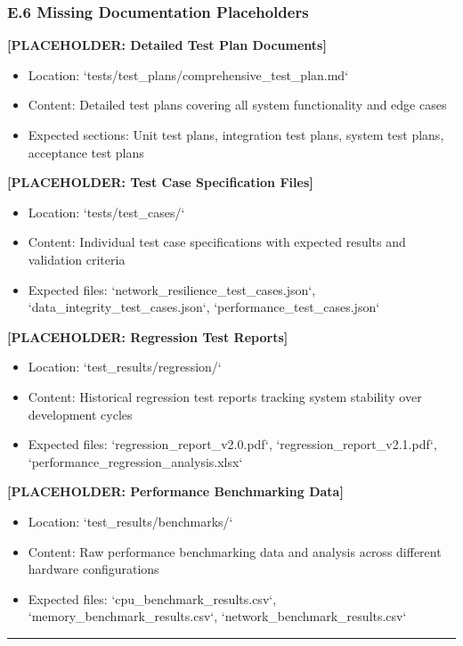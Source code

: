 \documentclass[11pt,a4paper]{article}
\begin{document}
\subsubsection{E.6 Missing Documentation Placeholders}

\textbf{[PLACEHOLDER: Detailed Test Plan Documents]}

\begin{itemize}
\item Location: `tests/test_plans/comprehensive_test_plan.md`
\item Content: Detailed test plans covering all system functionality and edge cases
\item Expected sections: Unit test plans, integration test plans, system test plans, acceptance test plans

\end{itemize}
\textbf{[PLACEHOLDER: Test Case Specification Files]}

\begin{itemize}
\item Location: `tests/test_cases/`
\item Content: Individual test case specifications with expected results and validation criteria
\item Expected files: `network_resilience_test_cases.json`, `data_integrity_test_cases.json`, `performance_test_cases.json`

\end{itemize}
\textbf{[PLACEHOLDER: Regression Test Reports]}

\begin{itemize}
\item Location: `test_results/regression/`
\item Content: Historical regression test reports tracking system stability over development cycles
\item Expected files: `regression_report_v2.0.pdf`, `regression_report_v2.1.pdf`, `performance_regression_analysis.xlsx`

\end{itemize}
\textbf{[PLACEHOLDER: Performance Benchmarking Data]}

\begin{itemize}
\item Location: `test_results/benchmarks/`
\item Content: Raw performance benchmarking data and analysis across different hardware configurations
\item Expected files: `cpu_benchmark_results.csv`, `memory_benchmark_results.csv`, `network_benchmark_results.csv`

\end{itemize}
\hrule
\end{document}
